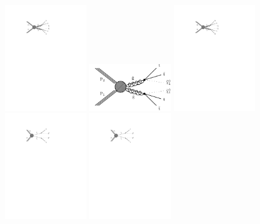 \begin{figure}
	\centering
	\includegraphics[width=0.32\textwidth]{results/figs/T1bbbb}
	\includegraphics[width=0.32\textwidth]{results/figs/T1tttt}
	\includegraphics[width=0.32\textwidth]{results/figs/T1qqqq}
	\includegraphics[width=0.32\textwidth]{results/figs/T2bb}
	\includegraphics[width=0.32\textwidth]{results/figs/T2tt}

\end{figure}
